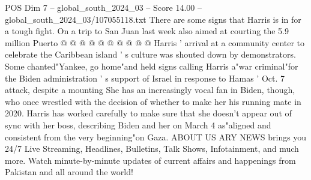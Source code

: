 \begin{textsample}{POS Dim 7 – global\_south\_2024\_03 – Score 14.00 – global\_south\_2024\_03/107055118.txt}
There are some signs that Harris is in for a tough fight.
On a trip to San Juan last week also aimed at courting the 5.9 million Puerto @ @ @ @ @ @ @ @ @ @ Harris ' arrival at a community center to celebrate the Caribbean island ' s culture was shouted down by demonstrators.
Some chanted"Yankee, go home"and held signs calling Harris a"war criminal"for the Biden administration ' s support of Israel in response to Hamas ' Oct. 7 attack, despite a mounting She has an increasingly vocal fan in Biden, though, who once wrestled with the decision of whether to make her his running mate in 2020.
Harris has worked carefully to make sure that she doesn't appear out of sync with her boss, describing Biden and her on March 4 as"aligned and consistent from the very beginning"on Gaza.
ABOUT US ARY NEWS brings you 24/7 Live Streaming, Headlines, Bulletins, Talk Shows, Infotainment, and much more.
Watch minute-by-minute updates of current affairs and happenings from Pakistan and all around the world!

\end{textsample}
